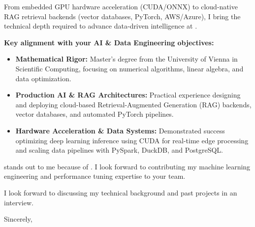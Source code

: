 \documentclass[11pt,a4paper]{article}
\begin{document}
From embedded GPU hardware acceleration (CUDA/ONNX) to cloud-native RAG retrieval backends (vector databases, PyTorch, AWS/Azure), I bring the technical depth required to advance data-driven intelligence at \textbf{\firmenName}.

\textbf{Key alignment with your AI \& Data Engineering objectives:}

\begin{itemize}[leftmargin=1.2em, itemsep=0.15em, parsep=0pt, topsep=0.2em]
    \item \textbf{Mathematical Rigor:} Master’s degree from the University of Vienna in Scientific Computing, focusing on numerical algorithms, linear algebra, and data optimization.
    \item \textbf{Production AI \& RAG Architectures:} Practical experience designing and deploying cloud-based Retrieval-Augmented Generation (RAG) backends, vector databases, and automated PyTorch pipelines.
    \item \textbf{Hardware Acceleration \& Data Systems:} Demonstrated success optimizing deep learning inference using CUDA for real-time edge processing and scaling data pipelines with PySpark, DuckDB, and PostgreSQL.
\end{itemize}

\textbf{\firmenName} stands out to me because of \textit{\firmenHighlight}. I look forward to contributing my machine learning engineering and performance tuning expertise to your team.

I look forward to discussing my technical background and past projects in an interview.

\vspace{0.6em}

Sincerely,

\vspace{1.2em}

\textbf{\meinName}
\end{document}
